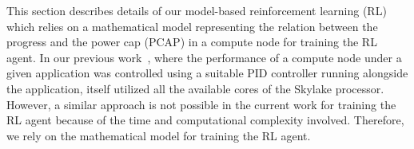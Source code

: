 This section describes details of our model-based reinforcement learning (RL) which relies on a mathematical model representing the relation between the progress and the power cap (PCAP) in a compute node for training the RL agent. 
In our previous work~\cite{cerf2021sustaining}, where the performance of a compute node under a given application was controlled using a suitable PID controller running alongside the application, itself utilized all the available cores of the Skylake processor. However, a similar approach is not possible in the current work for training the RL agent because of the time and computational complexity involved. Therefore, we rely on the mathematical model for training the RL agent. 

